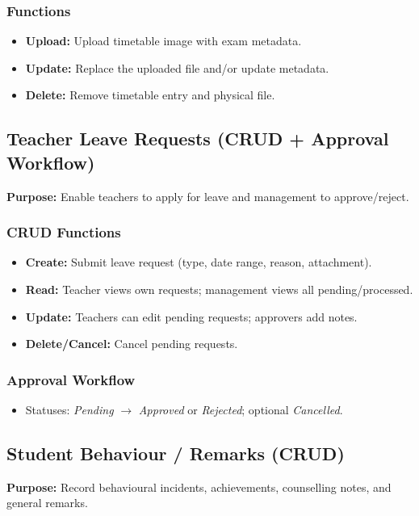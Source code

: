 \documentclass[12pt,a4paper]{article}
\begin{document}
\subsubsection*{Functions}
\begin{itemize}[leftmargin=*]
  \item \textbf{Upload:} Upload timetable image with exam metadata.
  \item \textbf{Update:} Replace the uploaded file and/or update metadata.
  \item \textbf{Delete:} Remove timetable entry and physical file.
\end{itemize}


\subsection{Teacher Leave Requests (CRUD + Approval Workflow)}
\textbf{Purpose:} Enable teachers to apply for leave and management to approve/reject.

\subsubsection*{CRUD Functions}
\begin{itemize}[leftmargin=*]
  \item \textbf{Create:} Submit leave request (type, date range, reason, attachment).
  \item \textbf{Read:} Teacher views own requests; management views all pending/processed.
  \item \textbf{Update:} Teachers can edit pending requests; approvers add notes.
  \item \textbf{Delete/Cancel:} Cancel pending requests.
\end{itemize}

\subsubsection*{Approval Workflow}
\begin{itemize}[leftmargin=*]
  \item Statuses: \textit{Pending} $\rightarrow$ \textit{Approved} or \textit{Rejected}; optional \textit{Cancelled}.
\end{itemize}

\subsection{Student Behaviour / Remarks (CRUD)}
\textbf{Purpose:} Record behavioural incidents, achievements, counselling notes, and general remarks.
\end{document}
